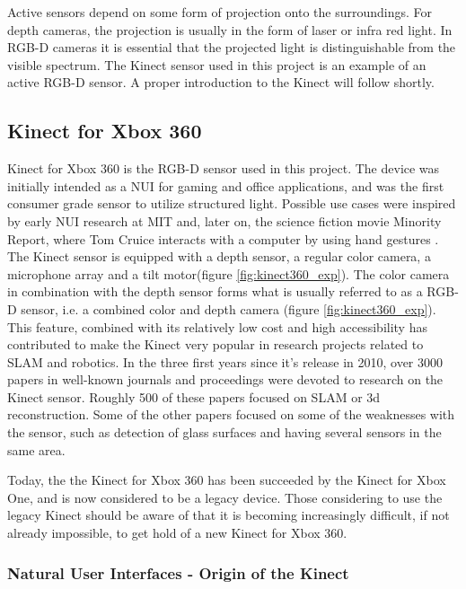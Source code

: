 Active sensors depend on some form of projection onto the surroundings. For depth cameras, the projection is usually in the form of laser or infra red light. In RGB-D cameras it is essential that the projected light is distinguishable from the visible spectrum. The Kinect sensor used in this project is an example of an active RGB-D sensor. A proper introduction to the Kinect will follow shortly.

\subsection{Kinect for Xbox 360}

Kinect for Xbox 360 is the RGB-D sensor used in this project. The device  was initially intended as a \ac{NUI} for gaming and office applications, and was the first consumer grade sensor to utilize structured light. Possible use cases were inspired by early \ac{NUI} research at \ac{MIT} and, later on, the science fiction movie Minority Report, where Tom Cruice interacts with a computer by using hand gestures \cite{kinect_book}. The Kinect sensor is equipped with a depth sensor, a regular color camera, a microphone array and a tilt motor(figure \ref{fig:kinect360_exp}). The color camera in combination with the depth sensor forms what is usually referred to as a RGB-D sensor, i.e. a combined color and depth camera (figure \ref{fig:kinect360_exp}). This feature, combined with its relatively low cost and high accessibility has contributed to make the Kinect very popular in research projects related to \ac{SLAM} and robotics. In the three first years since it's release in 2010, over 3000 papers in well-known journals and proceedings were devoted to research on the Kinect sensor. Roughly 500 of these papers focused on \ac{SLAM} or 3d reconstruction\cite{Berger2013}. Some of the other papers focused on some of the weaknesses with the sensor, such as detection of glass surfaces and having several sensors in the same area. 


Today, the the Kinect for Xbox 360 has been succeeded by the Kinect for Xbox One, and is now considered to be a legacy device. Those considering to use the legacy Kinect should be aware of that it is becoming increasingly difficult, if not already impossible, to get hold of a new Kinect for Xbox 360. 

\subsubsection{Natural User Interfaces - Origin of the Kinect}

